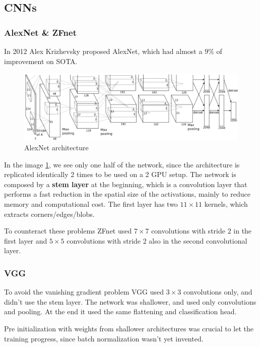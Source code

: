 \subsection{CNNs}

\subsubsection{AlexNet \& ZFnet}
In 2012 Alex Krizhevsky proposed AlexNet, which had almost a $9\%$ of improvement on SOTA.

\begin{figure}[htbp]
  \centering
  \includegraphics[width=0.8\linewidth]{./img/alexnet.png}
  \caption{AlexNet architecture}
  \label{fig:alexnet}
\end{figure}

In the image \ref{fig:alexnet}, we see only one half of the network, since the architecture is replicated identically 2 times to be used on a 2 GPU setup.
The network is composed by a \textbf{stem layer} at the beginning, which is a convolution layer that performs a fast reduction in the spatial size of the activations, mainly to reduce memory and computational cost.
The first layer has two $11 \times 11$ kernels, which extracts corners/edges/blobs.

To counteract these problems ZFnet used $7\times 7$ convolutions with stride 2 in the first layer and $5\times 5$ convolutions with stride 2 also in the second convolutional layer.

\subsubsection{VGG}
To avoid the vanishing gradient problem VGG used $3 \times 3$ convolutions only, and didn't use the stem layer.
The network was shallower, and used only convolutions and pooling.
At the end it used the same flattening and classification head.

Pre initialization with weights from shallower architectures was crucial to let the training progress, since batch normalization wasn't yet invented.

